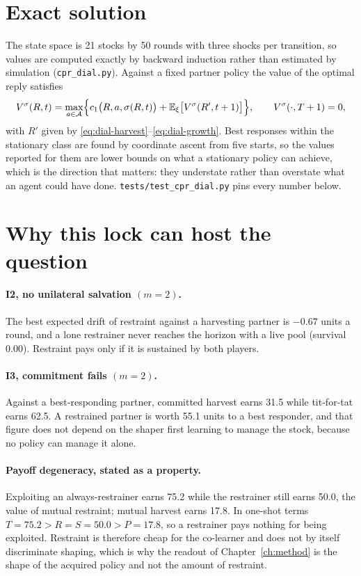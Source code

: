 \section{Exact solution}
\label{sec:env-solution}

The state space is 21 stocks by 50 rounds with three shocks per transition,
so values are computed exactly by backward induction rather than estimated
by simulation (\texttt{cpr\_dial.py}).
Against a fixed partner policy the value of the optimal reply satisfies
\begin{equation}
  V^{\sigma}(R,t)=\max_{a\in\mathcal{A}}
  \Bigl\{c_1\bigl(R,a,\sigma(R,t)\bigr)
    +\mathbb{E}_{\xi}\bigl[V^{\sigma}(R',t+1)\bigr]\Bigr\},
  \qquad V^{\sigma}(\cdot,T+1)=0,
  \label{eq:dial-bellman}
\end{equation}
with \(R'\) given by \eqref{eq:dial-harvest}--\eqref{eq:dial-growth}.
Best responses within the stationary class are found by coordinate ascent
from five starts, so the values reported for them are lower bounds on what a
stationary policy can achieve, which is the direction that matters: they
understate rather than overstate what an agent could have done.
\texttt{tests/test\_cpr\_dial.py} pins every number below.

\section{Why this lock can host the question}
\label{sec:env-invariants}

\paragraph{I2, no unilateral salvation \((m=2)\).}
The best expected drift of restraint against a harvesting partner is
\(-0.67\) units a round, and a lone restrainer never reaches the horizon
with a live pool (survival 0.00).
Restraint pays only if it is sustained by both players.

\paragraph{I3, commitment fails \((m=2)\).}
Against a best-responding partner, committed harvest earns 31.5 while
tit-for-tat earns 62.5.
A restrained partner is worth 55.1 units to a best responder, and that
figure does not depend on the shaper first learning to manage the stock,
because no policy can manage it alone.

\paragraph{Payoff degeneracy, stated as a property.}
Exploiting an always-restrainer earns 75.2 while the restrainer still earns
50.0, the value of mutual restraint; mutual harvest earns 17.8.
In one-shot terms \(T=75.2>R=S=50.0>P=17.8\), so a restrainer pays nothing
for being exploited.
Restraint is therefore cheap for the co-learner and does not by itself
discriminate shaping, which is why the readout of Chapter~\ref{ch:method} is
the shape of the acquired policy and not the amount of restraint.

